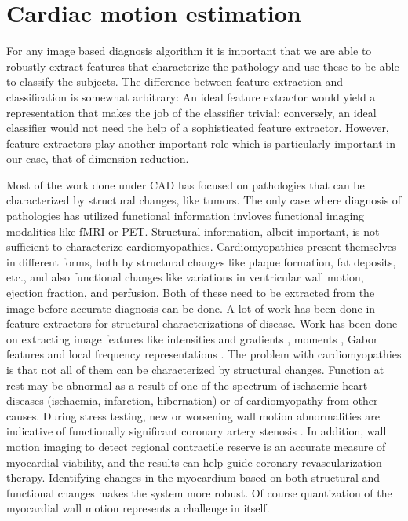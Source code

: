 \chapter {Cardiac motion estimation}
\label{sec:carMot}

For any image based diagnosis algorithm it is important that we are able to robustly extract features that characterize the pathology and use these to be able to classify the subjects. The difference between feature extraction and classification is somewhat arbitrary: An ideal feature extractor would yield a representation that makes the job of the classifier trivial; conversely, an ideal classifier would not need the help of a sophisticated feature extractor. However, feature extractors play another important role which is particularly important in our case, that of dimension reduction. 

Most of the work done under CAD has focused on pathologies that can be characterized by structural changes, like tumors. The only case where diagnosis of pathologies has utilized functional information invloves functional imaging modalities like fMRI or PET. Structural information, albeit important, is not sufficient to characterize cardiomyopathies. Cardiomyopathies present themselves in different forms, both by structural changes like plaque formation, fat deposits, etc., and also functional changes like variations in ventricular wall motion, ejection fraction, and perfusion. Both of these need to be extracted from the image before accurate diagnosis can be done. A lot of work has been done in feature extractors for structural characterizations of disease. Work has been done on extracting image features like intensities and gradients \cite{intgrad}, moments \cite{hammer}\cite{moments}, Gabor features \cite{manju96}\cite{anant} and local frequency representations \cite{locfreq}. The problem with cardiomyopathies is that not all of them can be characterized by structural changes. Function at rest may be abnormal as a result of one of the spectrum of ischaemic heart diseases (ischaemia, infarction, hibernation) or of cardiomyopathy from other causes. During stress testing, new or worsening wall motion abnormalities are indicative of functionally significant coronary artery stenosis \cite{stenoses}. In addition, wall motion imaging to detect regional contractile reserve is an accurate measure of myocardial viability, and the results can help guide coronary revascularization therapy. Identifying changes in the myocardium based on both structural and functional changes makes the system more robust. Of course quantization of the myocardial wall motion represents a challenge in itself.

